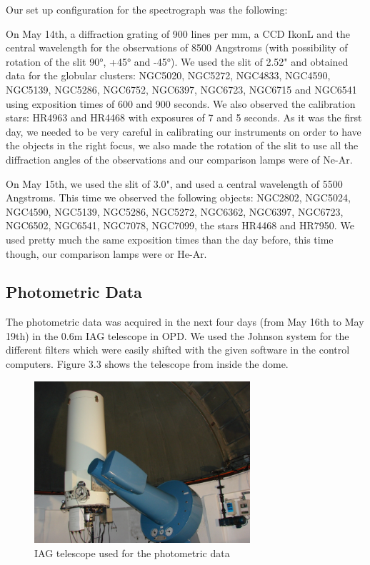Our set up configuration for the spectrograph was the following:

On May 14th, a diffraction grating of 900 lines per mm, a CCD IkonL and the central wavelength for the observations of 8500 Angstroms (with possibility of rotation of the slit 90°, +45° and -45°). We used the slit of 2.52" and obtained data for the globular clusters: NGC5020, NGC5272, NGC4833, NGC4590, NGC5139, NGC5286, NGC6752, NGC6397, NGC6723, NGC6715 and NGC6541 using exposition times of 600 and 900 seconds. We also observed the calibration stars: HR4963 and HR4468 with exposures of 7 and 5 seconds. As it was the first day, we needed to be very careful in calibrating our instruments on order to have the objects in the right focus, we also made the rotation of the slit to use all the diffraction angles of the observations and our comparison lamps were of Ne-Ar.

On May 15th, we used the slit of 3.0", and used a central wavelength of 5500 Angstroms. This time we observed the following objects: NGC2802, NGC5024, NGC4590, NGC5139, NGC5286, NGC5272, NGC6362, NGC6397, NGC6723, NGC6502, NGC6541, NGC7078, NGC7099, the stars HR4468 and HR7950. We used pretty much the same exposition times than the day before, this time though, our comparison lamps were or He-Ar.

\subsection{Photometric Data}

The photometric data was acquired in the next four days (from May 16th to May 19th) in the 0.6m IAG telescope in OPD. We used the Johnson system for the different filters which were easily shifted with the given software in the control computers. Figure 3.3 shows the telescope from inside the dome.

\begin{figure}[H]
\centering
\includegraphics[width=8cm]{images/opd-photometry.jpg}
\caption[IAG Telescope used for Photometry]{IAG telescope used for the photometric data}
\end{figure}

